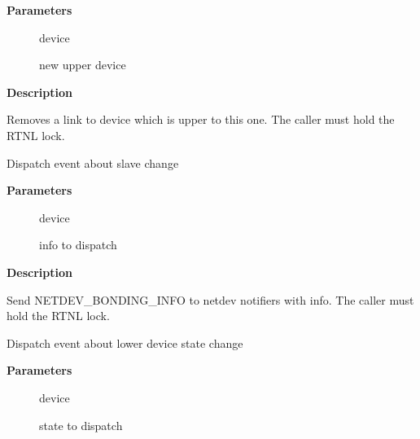 \documentclass[a4paper,8pt,english]{sphinxmanual}
\begin{document}
\textbf{Parameters}
\begin{description}
\item[{}] \leavevmode
device

\item[{}] \leavevmode
new upper device

\end{description}

\textbf{Description}

Removes a link to device which is upper to this one. The caller must hold
the RTNL lock.

\begin{fulllineitems}
\label{networking/kapi:c.netdev_bonding_info_change}
Dispatch event about slave change

\end{fulllineitems}


\textbf{Parameters}
\begin{description}
\item[{}] \leavevmode
device

\item[{}] \leavevmode
info to dispatch

\end{description}

\textbf{Description}

Send NETDEV\_BONDING\_INFO to netdev notifiers with info.
The caller must hold the RTNL lock.

\begin{fulllineitems}
\label{networking/kapi:c.netdev_lower_state_changed}
Dispatch event about lower device state change

\end{fulllineitems}


\textbf{Parameters}
\begin{description}
\item[{}] \leavevmode
device

\item[{}] \leavevmode
state to dispatch

\end{description}
\end{document}
